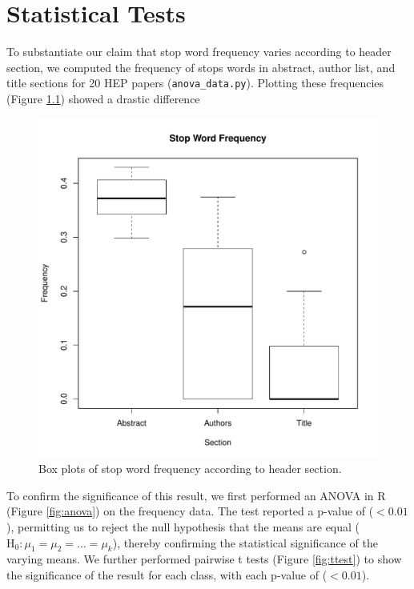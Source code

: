 
\chapter{Statistical Tests} %

\label{AppendixC} %


To substantiate our claim that stop word frequency varies according to header section, we computed the frequency of stops words in  abstract, author list, and title sections for 20 HEP papers (\texttt{anova\_data.py}). Plotting these frequencies (Figure \ref{fig:means}) showed a drastic difference

\begin{figure}[!ht]
\center
\includegraphics[width=4.5in]{Figures/means.pdf}
\caption{Box plots of stop word frequency according to header section.}
\label{fig:means}
\end{figure}

To confirm the significance of this result, we first performed an ANOVA in R (Figure \ref{fig:anova}) on the frequency data. The test reported a p-value of ($< 0.01$), permitting us to reject the null hypothesis that the means are equal ($\text{H}_0: \mu_1 = \mu_2 = \dots = \mu_k$), thereby confirming the statistical significance of the varying means. We further performed pairwise t tests (Figure \ref{fig:ttest}) to show the significance of the result for each class, with each p-value of ($< 0.01$).

